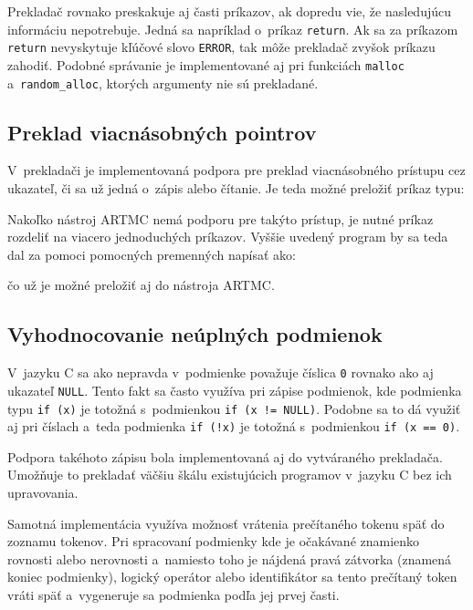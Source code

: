 Prekladač rovnako preskakuje aj časti príkazov, ak dopredu vie, že nasledujúcu informáciu nepotrebuje. Jedná sa napríklad o~príkaz \texttt{return}. Ak sa za príkazom \texttt{return} nevyskytuje kľúčové slovo \texttt{ERROR}, tak môže prekladač zvyšok príkazu zahodiť. Podobné správanie je implementované aj pri funkciách \texttt{malloc} a~\texttt{random\_alloc}, ktorých argumenty nie sú prekladané.
\newpage

\subsection{Preklad viacnásobných pointrov}
V~prekladači je implementovaná podpora pre preklad viacnásobného prístupu cez ukazateľ, či sa už jedná o~zápis alebo čítanie. Je teda možné preložiť príkaz typu:


\noindent
Nakoľko nástroj ARTMC nemá podporu pre takýto prístup, je nutné príkaz rozdeliť na viacero jednoduchých príkazov. Vyššie uvedený program by sa teda dal za pomoci pomocných premenných napísať ako:


\noindent
čo už je možné preložiť aj do nástroja ARTMC.

\subsection{Vyhodnocovanie neúplných podmienok}
V~jazyku C sa ako nepravda v~podmienke považuje číslica \texttt{0} rovnako ako aj ukazateľ \texttt{NULL}. Tento fakt sa často využíva pri zápise podmienok, kde podmienka typu \texttt{if (x)} je totožná s~podmienkou \texttt{if (x != NULL)}. Podobne sa to dá využiť aj pri číslach a~teda podmienka \texttt{if (!x)} je totožná s~podmienkou \texttt{if (x == 0)}.

Podpora takéhoto zápisu bola implementovaná aj do vytváraného prekladača. Umožňuje to prekladať väčšiu škálu existujúcich programov v~jazyku C bez ich upravovania.

Samotná implementácia využíva možnosť vrátenia prečítaného tokenu späť do zoznamu tokenov. Pri spracovaní podmienky kde je očakávané znamienko rovnosti alebo nerovnosti a~namiesto toho je nájdená pravá zátvorka (znamená koniec podmienky), logický operátor alebo identifikátor sa tento prečítaný token vráti späť a~vygeneruje sa podmienka podľa jej prvej časti.

